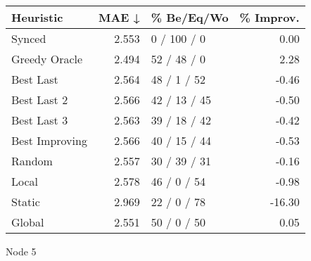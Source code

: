 \begin{tabular}{lrlr}
\toprule
\textbf{Heuristic} & \textbf{MAE ↓} & \textbf{\% Be/Eq/Wo} & \textbf{\% Improv.} \\
\midrule
            Synced &          2.553 &          0 / 100 / 0 &                0.00 \\
     Greedy Oracle &          2.494 &          52 / 48 / 0 &                2.28 \\
         Best Last &          2.564 &          48 / 1 / 52 &               -0.46 \\
       Best Last 2 &          2.566 &         42 / 13 / 45 &               -0.50 \\
       Best Last 3 &          2.563 &         39 / 18 / 42 &               -0.42 \\
    Best Improving &          2.566 &         40 / 15 / 44 &               -0.53 \\
            Random &          2.557 &         30 / 39 / 31 &               -0.16 \\
             Local &          2.578 &          46 / 0 / 54 &               -0.98 \\
            Static &          2.969 &          22 / 0 / 78 &              -16.30 \\
            Global &          2.551 &          50 / 0 / 50 &                0.05 \\
\bottomrule
\end{tabular}
\caption{Node 5}
\label{tab:hr_iid_lr01_le2_bs2_5}
